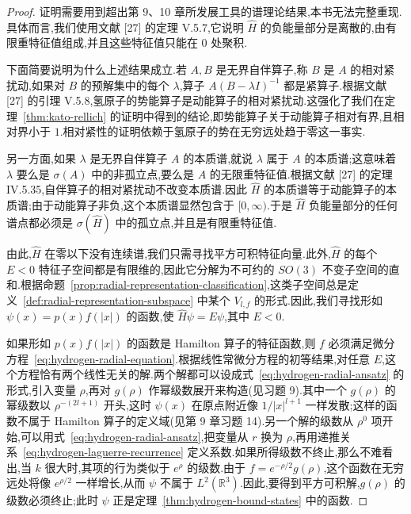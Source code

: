 {\begin{proof}
证明需要用到超出第 9、10 章所发展工具的谱理论结果,本书无法完整重现.具体而言,我们使用文献 [27] 的定理 V.5.7,它说明 $\widehat H$ 的负能量部分是离散的,由有限重特征值组成,并且这些特征值只能在 $0$ 处聚积.

下面简要说明为什么上述结果成立.若 $A,B$ 是无界自伴算子,称 $B$ 是 $A$ 的相对紧扰动,如果对 $B$ 的预解集中的每个 $\lambda$,算子 $A(B-\lambda I)^{-1}$ 都是紧算子.根据文献 [27] 的引理 V.5.8,氢原子的势能算子是动能算子的相对紧扰动.这强化了我们在定理~\ref{thm:kato-rellich} 的证明中得到的结论,即势能算子关于动能算子相对有界,且相对界小于 $1$.相对紧性的证明依赖于氢原子的势在无穷远处趋于零这一事实.

另一方面,如果 $\lambda$ 是无界自伴算子 $A$ 的本质谱,就说 $\lambda$ 属于 $A$ 的本质谱;这意味着 $\lambda$ 要么是 $\sigma(A)$ 中的非孤立点,要么是 $A$ 的无限重特征值.根据文献 [27] 的定理 IV.5.35,自伴算子的相对紧扰动不改变本质谱.因此 $\widehat H$ 的本质谱等于动能算子的本质谱;由于动能算子非负,这个本质谱显然包含于 $[0,\infty)$.于是 $\widehat H$ 负能量部分的任何谱点都必须是 $\sigma(\widehat H)$ 中的孤立点,并且是有限重特征值.

由此,$\widehat H$ 在零以下没有连续谱,我们只需寻找平方可积特征向量.此外,$\widehat H$ 的每个 $E<0$ 特征子空间都是有限维的,因此它分解为不可约的 $SO(3)$ 不变子空间的直和.根据命题~\ref{prop:radial-representation-classification},这类子空间总是定义~\ref{def:radial-representation-subspace} 中某个 $V_{l,f}$ 的形式.因此,我们寻找形如 $\psi(x)=p(x)f(|x|)$ 的函数,使 $\widehat H\psi=E\psi$,其中 $E<0$.

如果形如 $p(x)f(|x|)$ 的函数是 Hamilton 算子的特征函数,则 $f$ 必须满足微分方程~\eqref{eq:hydrogen-radial-equation}.根据线性常微分方程的初等结果,对任意 $E$,这个方程恰有两个线性无关的解.两个解都可以设成式~\eqref{eq:hydrogen-radial-ansatz} 的形式,引入变量 $\rho$,再对 $g(\rho)$ 作幂级数展开来构造(见习题 9).其中一个 $g(\rho)$ 的幂级数以 $\rho^{-(2l+1)}$ 开头,这时 $\psi(x)$ 在原点附近像 $1/|x|^{l+1}$ 一样发散;这样的函数不属于 Hamilton 算子的定义域(见第 9 章习题 14).另一个解的级数从 $\rho^0$ 项开始,可以用式~\eqref{eq:hydrogen-radial-ansatz},把变量从 $r$ 换为 $\rho$,再用递推关系~\eqref{eq:hydrogen-laguerre-recurrence} 定义系数.如果所得级数不终止,那么不难看出,当 $k$ 很大时,其项的行为类似于 $e^\rho$ 的级数.由于 $f=e^{-\rho/2}g(\rho)$,这个函数在无穷远处将像 $e^{\rho/2}$ 一样增长,从而 $\psi$ 不属于 $L^2(\mathbb R^3)$.因此,要得到平方可积解,$g(\rho)$ 的级数必须终止;此时 $\psi$ 正是定理~\ref{thm:hydrogen-bound-states} 中的函数.
\end{proof}

}
